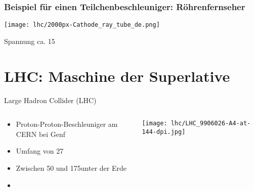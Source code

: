 \begin{frame}
  \frametitle{Beispiel f\"ur einen Teilchenbeschleuniger: R\"ohrenfernseher}
  \begin{center}
    \texttt{[image: lhc/2000px-Cathode\_ray\_tube\_de.png]}
  \end{center}
  \vskip1cm
  Spannung ca. 15\kev
\end{frame}

\section{LHC: Maschine der Superlative}
{
  \begin{frame}
    \pause
    \begin{center}
      \begin{block}{Large Hadron Collider (LHC)}
        \begin{columns}
          \begin{column}{0.6\textwidth}
            \begin{itemize}
            \item Proton-Proton-Beschleuniger am CERN bei Genf
            \item Umfang von 27\km
            \item Zwischen 50 und 175\m unter der Erde
            \item[~] ~
            \end{itemize}
          \end{column}
          \begin{column}{0.4\textwidth}
            \vskip-0.5cm
            \centering
            \texttt{[image: lhc/LHC\_9906026-A4-at-144-dpi.jpg]}
          \end{column}
        \end{columns}
      \end{block}
   \end{center}
  \end{frame}

}
